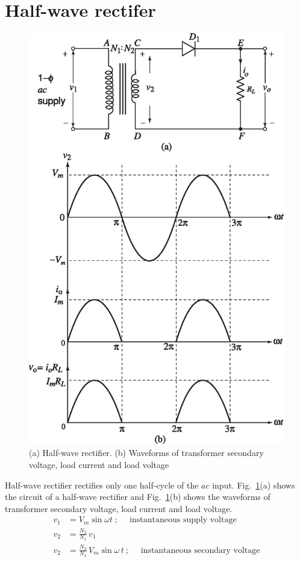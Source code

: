 \vfill\eject

\section{Half-wave rectifer}\label{sec2.2}
\begin{figure}[H]
\centering
\includegraphics[scale=.8]{chap2/add-fig/S3-EE-02-001ab.eps}
\caption{(a) Half-wave rectifier. (b) Waveforms of transformer secondary voltage, load current and load voltage}\label{fig2.1}
\end{figure}

Half-wave rectifier rectifies only one half-cycle of the $ac$
input. Fig.~\ref{fig2.1}(a) shows the circuit of a half-wave rectifier and
Fig.~\ref{fig2.1}(b) shows the waveforms of transformer secondary voltage, load
current and load voltage.
\begin{align}
v_1 & = V_m \sin \omega t~; \quad \text{ instantaneous supply
  voltage} \label{eq2.1}\\[4pt]
v_2 & = \frac{N_2}{N_1} \, v_1 \label{eq2.2}\\[4pt]
v_2 & = \frac{N_2}{N_1}\, V_m \sin \omega\, t~; \quad \text{ instantaneous
  secondary voltage} \label{eq2.3}
\end{align}

